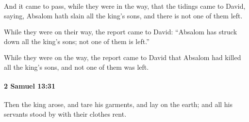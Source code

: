 			\begin{versebox}
					\item[BHS] 
					\item[ASV] And it came to pass, while they were in the way, that the tidings came to David, saying, Absalom hath slain all the king's sons, and there is not one of them left.
					\item[NIV] While they were on their way, the report came to David: “Absalom has struck down all the king’s sons; not one of them is left.”
					\item[NRSV] While they were on the way, the report came to David that Absalom had killed all the king’s sons, and not one of them was left.
			\end{versebox}

		\paragraph{2 Samuel 13:31} %
			\label{2SAMUEL-13-31}

			Then the king arose, and tare his garments, and lay on the earth; and all his servants stood by with their clothes rent.

